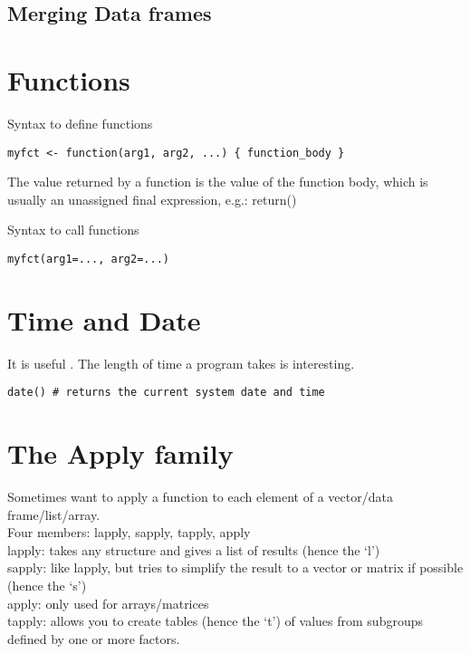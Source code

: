 \subsection{Merging Data frames}

\section{Functions}
Syntax to define functions

\begin{framed}
\begin{verbatim}
myfct <- function(arg1, arg2, ...) { function_body }
\end{verbatim}
\end{framed}
The value returned by a function is the value of the function body, which is usually an unassigned final expression, e.g.: return()

Syntax to call functions
\begin{framed}
\begin{verbatim}
myfct(arg1=..., arg2=...)
\end{verbatim}
\end{framed}


\section{Time and Date}
It is useful . The length of time a program takes is interesting.


\begin{framed}
\begin{verbatim}
date() # returns the current system date and time
\end{verbatim}
\end{framed}


\section{The Apply family}

Sometimes want to apply a function to each element of a
vector/data frame/list/array.
\\
Four members: lapply, sapply, tapply, apply
\\
lapply: takes any structure and gives a list of results (hence
the `l')
\\
sapply: like lapply, but tries to simplify the result to a
vector or matrix if possible (hence the `s')
\\
apply: only used for arrays/matrices
\\
tapply: allows you to create tables (hence the `t') of values
from subgroups defined by one or more factors.
\newpage
